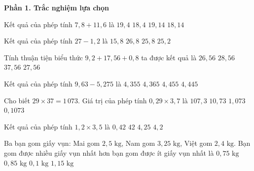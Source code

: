 \textbf{Phần 1. Trắc nghiệm lựa chọn}

\begin{ex} %
Kết quả của phép tính $7{,}8 + 11{,}6$ là
\choice
{\True $19{,}4$}
{$18{,}4$}
{$19{,}14$}
{$18{,}14$}
\end{ex}

\begin{ex} %
Kết quả của phép tính $27 - 1{,}2$ là
\choice
{$15{,}8$}
{$26{,}8$}
{\True $25{,}8$}
{$25{,}2$}
\end{ex}

\begin{ex} %
Tính thuận tiện biểu thức $9{,}2 + 17{,}56 + 0{,}8$ ta được kết quả là
\choice
{$26{,}56$}
{$28{,}56$}
{$37{,}56$}
{\True $27{,}56$}
\end{ex}

\begin{ex} %
Kết quả của phép tính $9{,}63 - 5{,}275$ là
\choice
{\True $4{,}355$}
{$4{,}365$}
{$4{,}455$}
{$4{,}445$}
\end{ex}

\begin{ex} %
Cho biết $29 \times 37 = 1\,073$. Giá trị của phép tính $0{,}29 \times 3{,}7$ là
\choice
{$107{,}3$}
{$10{,}73$}
{\True $1{,}073$}
{$0{,}1073$}
\end{ex}

\begin{ex} %
Kết quả của phép tính $1{,}2 \times 3{,}5$ là
\choice
{$0{,}42$}
{$42$}
{$4{,}25$}
{\True $4{,}2$}
\end{ex}

\begin{ex} %
Ba bạn gom giấy vụn: Mai gom $2{,}5\text{ kg}$, Nam gom $3{,}25\text{ kg}$, Việt gom $2{,}4\text{ kg}$. Bạn gom được nhiều giấy vụn nhất hơn bạn gom được ít giấy vụn nhất là
\choice
{$0{,}75\text{ kg}$}
{\True $0{,}85\text{ kg}$}
{$0{,}1\text{ kg}$}
{$1{,}15\text{ kg}$}
\end{ex}

